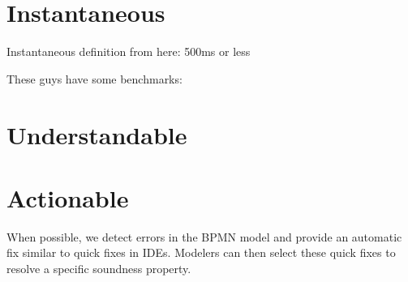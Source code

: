 \documentclass[runningheads]{llncs}
\begin{document}

\cite{corradiniClassificationBPMNCollaborations2018}


\section{Instantaneous}
Instantaneous definition from here: \cite{fahlandAnalysisDemandInstantaneous2011}
500ms or less


These guys have some benchmarks:
\cite{corradiniFormalApproachAnalysis2021}

\section{Understandable}

\cite{camundaservicesgmbhBpmnjsTokenSimulation2024}

\section{Actionable}


When possible, we detect errors in the BPMN model and provide an automatic fix similar to quick fixes in IDEs.
Modelers can then select these quick fixes to resolve a specific soundness property.
\end{document}
